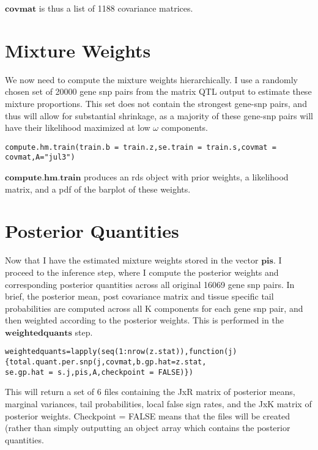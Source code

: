 \documentclass[10pt]{article}
\begin{document}
\begin{itemize}
\begin{verbatim}
\end{verbatim}

$\textbf{covmat}$ is thus a list of 1188 covariance matrices.


\section{Mixture Weights}
We now need to compute the mixture weights hierarchically. I use  a randomly chosen set of 20000 gene snp pairs from the matrix QTL output to estimate these mixture proportions. This set does not contain the strongest gene-snp pairs, and thus will allow for substantial shrinkage, as a majority of these gene-snp pairs will  have their likelihood maximized at low $\omega$ components.

\begin{verbatim}
compute.hm.train(train.b = train.z,se.train = train.s,covmat = covmat,A="jul3")
\end{verbatim}

$\textbf{compute.hm.train}$ produces an rds object with prior weights, a likelihood matrix, and a pdf of the barplot of these weights.

\section{Posterior Quantities}
Now that I have the estimated mixture weights stored in the vector $\textbf{pis}$. I proceed to the inference step, where I compute the posterior weights and corresponding posterior quantities across all original 16069 gene snp pairs. In brief, the posterior mean, post covariance matrix and tissue specific tail probabilities are computed across all K components for each gene snp pair, and then weighted according to the posterior weights. This is performed in the $\textbf{weightedquants}$ step.


 \begin{verbatim}
weightedquants=lapply(seq(1:nrow(z.stat)),function(j){total.quant.per.snp(j,covmat,b.gp.hat=z.stat,
se.gp.hat = s.j,pis,A,checkpoint = FALSE)})
\end{verbatim}                          
%  
%
This will return a set of 6 files containing the JxR matrix of posterior means, marginal variances, tail probabilities, local false sign rates, and the JxK matrix of posterior weights. Checkpoint = FALSE means that the files will be created (rather than simply outputting an object array which contains the posterior quantities.



\end{itemize}
\end{document}
